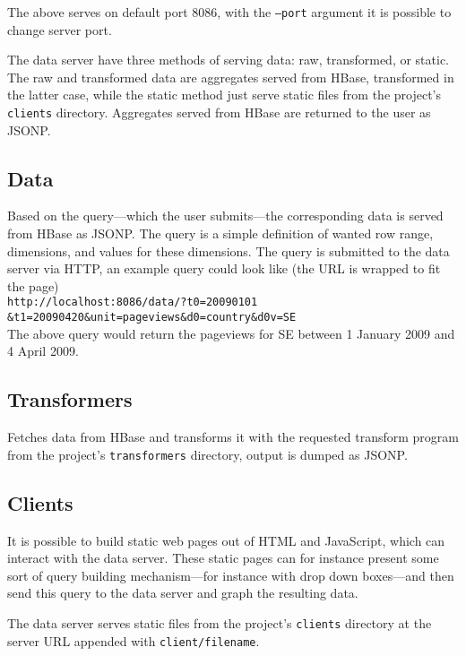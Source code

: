 \documentclass[a4paper,10pt]{book}
\begin{document}
\noindent The above serves on default port 8086, with the \texttt{--port}
argument it is possible to change server port.

The data server have three methods of serving data: raw, transformed, or
static. The raw and transformed data are aggregates served from HBase,
transformed in the latter case, while the static method just serve static
files from the project's \texttt{clients} directory. Aggregates served from
HBase are returned to the user as JSONP.


\subsection{Data}

Based on the query---which the user submits---the corresponding data is
served from HBase as JSONP. The query is a simple definition of wanted row
range, dimensions, and values for these dimensions. The query is submitted
to the data server via HTTP, an example query could look like (the URL is
wrapped to fit the page) \\

\texttt{http://localhost:8086/data/?t0=20090101 \\
\&t1=20090420\&unit=pageviews\&d0=country\&d0v=SE} \\

The above query would return the pageviews for SE between 1 January 2009
and 4 April 2009.


\subsection{Transformers}

Fetches data from HBase and transforms it with the requested transform
program from the project's \texttt{transformers} directory, output is
dumped as JSONP.


\subsection{Clients}

It is possible to build static web pages out of HTML and JavaScript, which
can interact with the data server. These static pages can for instance
present some sort of query building mechanism---for instance with drop down
boxes---and then send this query to the data server and graph the resulting
data.

The data server serves static files from the project's \texttt{clients}
directory at the server URL appended with \texttt{client/filename}.
\end{document}
